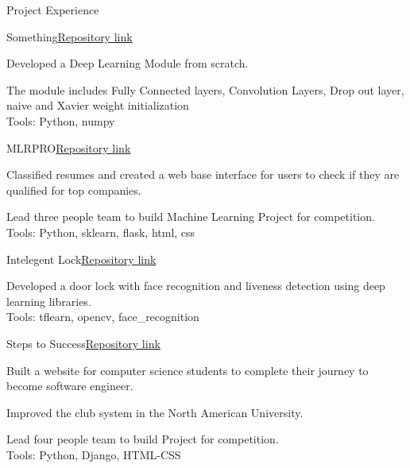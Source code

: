 \documentclass[10pt]{resume} %
\begin{document}
\begin{rSection}{Project Experience}
\begin{rSubsection}{Something}{\href{https://github.com/AhmetHamzaEmra/Something}{Repository link}}{}{}
\item Developed a Deep Learning Module from scratch.
\item The module includes Fully Connected layers, Convolution Layers, Drop out layer, naive and Xavier weight initialization
\\ Tools: Python, numpy

\end{rSubsection}

\begin{rSubsection}{MLRPRO}{\href{https://github.com/AhmetHamzaEmra/MLRPRO}{Repository link}}{}{}
\item Classified resumes and created a web base interface for users to check if they are qualified for top companies.
\item Lead three people team to build Machine Learning Project for competition.
\\ Tools: Python, sklearn, flask, html, css

\end{rSubsection}



\begin{rSubsection}{Intelegent Lock}{\href{https://github.com/AhmetHamzaEmra/Intelegent_Lock}{Repository link}}{}{}
\item Developed a door lock with face recognition and liveness detection using deep learning libraries.
\\ Tools: tflearn, opencv, face\_recognition
\end{rSubsection}



\begin{rSubsection}{Steps to Success}{\href{https://github.com/AhmetHamzaEmra/StepsToSuccess}{Repository link}}{}{}
\item Built a website for computer science students to complete their journey to become software engineer.
\item Improved the club system in the North American University. 
\item Lead four people team to build Project for competition.
\\ Tools: Python, Django, HTML-CSS
\end{rSubsection}


\end{rSection}
\end{document}
